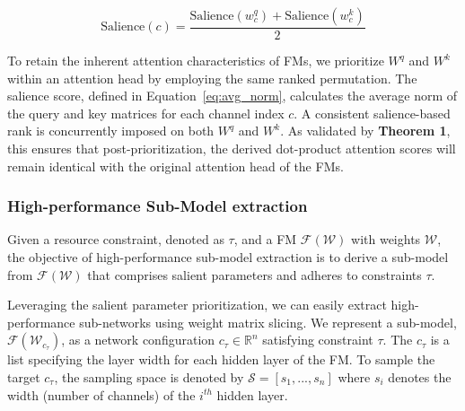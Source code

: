 \begin{equation}
\text{Salience}(c) = \frac{\text{Salience}(w^q_c) + \text{Salience}(w^k_c) }{2}
\label{eq:avg_norm}
\end{equation}

To retain the inherent attention characteristics of FMs, we prioritize $W^q$ and $W^k$ within an attention head by employing the same ranked permutation. The salience score, defined in Equation~\ref{eq:avg_norm}, calculates the average norm of the query and key matrices for each channel index $c$. A consistent salience-based rank is concurrently imposed on both $W^q$ and $W^k$. As validated by \textbf{Theorem 1}, this ensures that post-prioritization, the derived dot-product attention scores will remain identical with the original attention head of the FMs.









\subsubsection{High-performance Sub-Model extraction}
Given a resource constraint, denoted as \( \tau \), and a FM \( \mathcal{F(W)} \) with weights \( \mathcal{W} \), the objective of high-performance sub-model extraction is to derive a sub-model from \( \mathcal{F(W)} \) that comprises salient parameters and adheres to constraints \( \tau \).


Leveraging the salient parameter prioritization, we can easily extract high-performance sub-networks using weight matrix slicing.  We represent a sub-model, \( \mathcal{F}(\mathcal{W}_{c_\tau}) \), as a network configuration \( c_\tau  \in \mathbb{R}^n \) satisfying constraint $\tau$. The \( c_\tau\) is a list specifying the layer width for each hidden layer of the FM.
To sample the target $c_\tau$, the sampling space is denoted by \( \mathcal{S} = [s_1, ... , s_n] \) where \( s_i \) denotes the width (number of channels) of the \( i^{th} \) hidden layer.

